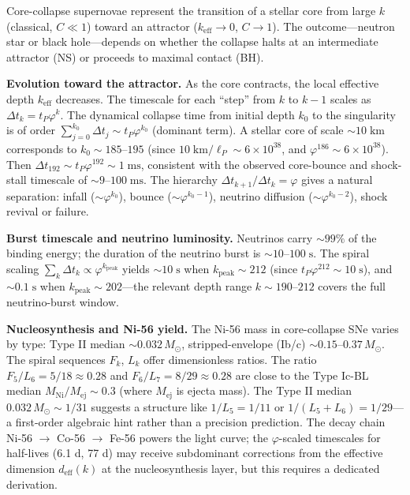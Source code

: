 \documentclass[12pt,a4paper]{article}
\begin{document}
Core-collapse supernovae represent the transition of a stellar core from large $k$ (classical, $C \ll 1$) toward an attractor ($k_{\mathrm{eff}} \to 0$, $C \to 1$). The outcome---neutron star or black hole---depends on whether the collapse halts at an intermediate attractor (NS) or proceeds to maximal contact (BH).

\textbf{Evolution toward the attractor.} As the core contracts, the local effective depth $k_{\mathrm{eff}}$ decreases. The timescale for each ``step'' from $k$ to $k-1$ scales as $\Delta t_k = t_P \varphi^k$. The dynamical collapse time from initial depth $k_0$ to the singularity is of order $\sum_{j=0}^{k_0} \Delta t_j \sim t_P \varphi^{k_0}$ (dominant term). A stellar core of scale $\sim 10\;\mathrm{km}$ corresponds to $k_0 \sim 185$--$195$ (since $10\;\mathrm{km}/\ell_P \sim 6 \times 10^{38}$, and $\varphi^{186} \sim 6 \times 10^{38}$). Then $\Delta t_{192} \sim t_P \varphi^{192} \sim 1\;\mathrm{ms}$, consistent with the observed core-bounce and shock-stall timescale of $\sim 9$--$100\;\mathrm{ms}$. The hierarchy $\Delta t_{k+1}/\Delta t_k = \varphi$ gives a natural separation: infall ($\sim \varphi^{k_0}$), bounce ($\sim \varphi^{k_0-1}$), neutrino diffusion ($\sim \varphi^{k_0-2}$), shock revival or failure.

\textbf{Burst timescale and neutrino luminosity.} Neutrinos carry $\sim 99\%$ of the binding energy; the duration of the neutrino burst is $\sim 10$--$100\;\mathrm{s}$. The spiral scaling $\sum_{k} \Delta t_k \propto \varphi^{k_{\mathrm{peak}}}$ yields $\sim 10\;\mathrm{s}$ when $k_{\mathrm{peak}} \sim 212$ (since $t_P \varphi^{212} \sim 10\;\mathrm{s}$), and $\sim 0.1\;\mathrm{s}$ when $k_{\mathrm{peak}} \sim 202$---the relevant depth range $k \sim 190$--$212$ covers the full neutrino-burst window.

\textbf{Nucleosynthesis and Ni-56 yield.} The Ni-56 mass in core-collapse SNe varies by type: Type II median $\sim 0.032\,M_\odot$, stripped-envelope (Ib/c) $\sim 0.15$--$0.37\,M_\odot$. The spiral sequences $F_k$, $L_k$ offer dimensionless ratios. The ratio $F_5/L_6 = 5/18 \approx 0.28$ and $F_6/L_7 = 8/29 \approx 0.28$ are close to the Type Ic-BL median $M_{\mathrm{Ni}}/M_{\mathrm{ej}} \sim 0.3$ (where $M_{\mathrm{ej}}$ is ejecta mass). The Type II median $0.032\,M_\odot \sim 1/31$ suggests a structure like $1/L_5 = 1/11$ or $1/(L_5 + L_6) = 1/29$---a first-order algebraic hint rather than a precision prediction. The decay chain Ni-56 $\to$ Co-56 $\to$ Fe-56 powers the light curve; the $\varphi$-scaled timescales for half-lives (6.1 d, 77 d) may receive subdominant corrections from the effective dimension $d_{\mathrm{eff}}(k)$ at the nucleosynthesis layer, but this requires a dedicated derivation.
\end{document}
